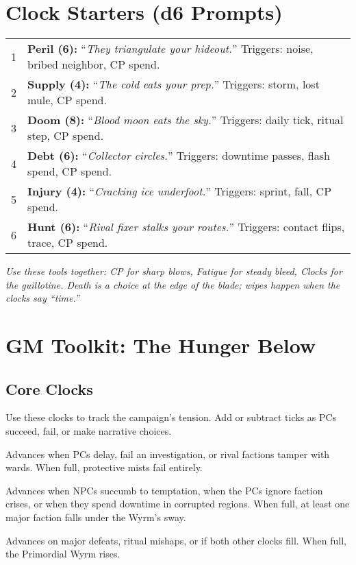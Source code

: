 \documentclass[12pt]{book}
\begin{document}
\section{Clock Starters (d6 Prompts)}
\begin{tabular}{@{}r p{11.5cm}@{}}
1 & \textbf{Peril (6):} ``\emph{They triangulate your hideout.}'' Triggers: noise, bribed neighbor, CP spend.\\
2 & \textbf{Supply (4):} ``\emph{The cold eats your prep.}'' Triggers: storm, lost mule, CP spend.\\
3 & \textbf{Doom (8):} ``\emph{Blood moon eats the sky.}'' Triggers: daily tick, ritual step, CP spend.\\
4 & \textbf{Debt (6):} ``\emph{Collector circles.}'' Triggers: downtime passes, flash spend, CP spend.\\
5 & \textbf{Injury (4):} ``\emph{Cracking ice underfoot.}'' Triggers: sprint, fall, CP spend.\\
6 & \textbf{Hunt (6):} ``\emph{Rival fixer stalks your routes.}'' Triggers: contact flips, trace, CP spend.\\
\end{tabular}

\bigskip
\noindent\emph{Use these tools together: CP for sharp blows, Fatigue for steady bleed, Clocks for the guillotine. Death is a choice at the edge of the blade; wipes happen when the clocks say ``time.''}

\section*{GM Toolkit: The Hunger Below}

\subsection*{Core Clocks}
Use these clocks to track the campaign’s tension. Add or subtract ticks as PCs succeed, fail, or make narrative choices.

\begin{description}[leftmargin=2cm]
  \item[Waystone Cracks (6-step):] Advances when PCs delay, fail an investigation, or rival factions tamper with wards. When full, protective mists fail entirely.
  \item[Whisper Spread (8-step):] Advances when NPCs succumb to temptation, when the PCs ignore faction crises, or when they spend downtime in corrupted regions. When full, at least one major faction falls under the Wyrm’s sway.
  \item[Chains Breaking (10-step):] Advances on major defeats, ritual mishaps, or if both other clocks fill. When full, the Primordial Wyrm rises.
\end{description}
\end{document}
